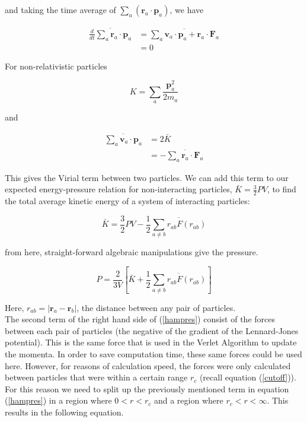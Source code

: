 \documentclass{article}
\begin{document}
\begin{multicols}{2}
\noindent and taking the time average of $\sum \limits _a (\textbf{r}_a \cdot \textbf{p}_a)$, we have

\begin{equation}
\begin{split}
\overline{\frac{d}{dt} \sum \limits _a \textbf{r}_a \cdot \textbf{p}_a} & = \overline{\sum \limits _a \textbf{v}_a \cdot \textbf{p}_a + \textbf{r}_a \cdot \textbf{F}_a} \\
& = 0
\end{split}
\end{equation}

\noindent  For non-relativistic particles 

\begin{equation}
K = \sum \limits _a \frac{\textbf{p}_{a}^2}{2m_a}
\end{equation}

\noindent and 

\begin{equation}
\begin{split}
\overline{\sum \limits _a \textbf{v}_a \cdot \textbf{p}_a} & = 2\bar{K} \\
& = - \overline{\sum \limits _a \textbf{r}_a \cdot \textbf{F}_a}
\end{split}
\end{equation}

\noindent This gives the Virial term between two particles.  We can add this term to our expected energy-pressure relation for non-interacting particles, $\bar{K}=\frac{3}{2}PV$, to find the total average kinetic energy of a system of interacting particles:  

\begin{equation}
\bar{K} = \frac{3}{2} PV - \frac{1}{2} \overline{\sum \limits _{a \ne b} r_{ab} F(r_{ab})}
\end{equation}

\noindent from here, straight-forward algebraic manipulations give the pressure.

\begin{equation}
P = \frac{2}{3V} \left [ \bar{K} + \frac{1}{2} \overline{\sum \limits _{a\ne b} r_{ab} F(r_{ab})} \right ]
\label{hampres}
\end{equation}

\noindent Here, $r_{ab} = |\textbf{r}_a - \textbf{r}_b|$, the distance between any pair of particles. \\

The second term of the right hand side of (\ref{hampres}) consist of the forces between each pair of particles (the negative of the gradient of the Lennard-Jones potential).  This is the same force that is used in the Verlet Algorithm to update the momenta.  In order to save computation time, these same forces could be used here.  However, for reasons of calculation speed, the forces were only calculated between particles that were within a certain range $r_c$ (recall equation (\ref{cutoff})). For this reason we need to split up the previously mentioned term in equation (\ref{hampres}) in a region where $0 < r < r_c $ and a region where $ r_c < r < \infty $. This results in the following equation.


\end{multicols}
\end{document}

